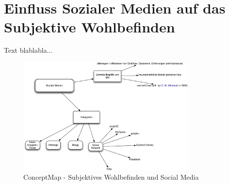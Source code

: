 %
%
\thispagestyle{empty}
\chapter{Einfluss Sozialer Medien auf das Subjektive Wohlbefinden}\label{chap.einfluss}
Text blablabla...
\begin{figure}[H]
	\centering
		\includegraphics[width=0.8\textwidth]{images/grafiken/02_SozialeNetzwerke_Ueberblick.pdf}
	\caption{ConceptMap - Subjektives Wohlbefinden und Social Media}
	\label{fig.ConceptMapSwbSm}
\end{figure}

